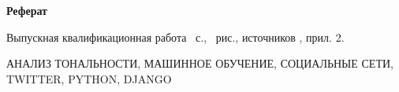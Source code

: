 \begin{center}
	\textbf{Реферат}
\end{center}

Выпускная квалификационная работа ~с., ~рис., источников , прил. 2.

АНАЛИЗ ТОНАЛЬНОСТИ, МАШИННОЕ ОБУЧЕНИЕ, СОЦИАЛЬНЫЕ СЕТИ, TWITTER, PYTHON, DJANGO

